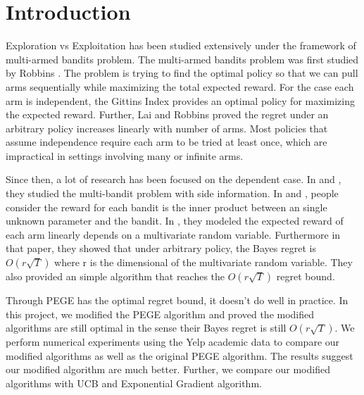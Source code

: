 \documentclass{article}
\theoremstyle{plain}
\theoremstyle{definition}
\begin{document}
 


\section{Introduction}

Exploration vs Exploitation has been studied extensively under the framework of multi-armed bandits problem. The multi-armed bandits problem was first studied by Robbins \cite{Robbins}. The problem is trying to find the optimal policy so that we can pull arms sequentially while maximizing the total expected reward. For the case each arm is independent, the Gittins Index \cite{Gittins} provides an optimal policy for maximizing the expected reward. Further, Lai and Robbins \cite{Lai} proved the regret under an arbitrary policy increases linearly with number of arms. Most policies that assume independence require each arm to be tried at least once, which are impractical in settings involving many or infinite arms. 

Since then, a lot of research has been focused on the dependent case. In \cite{Gabor} and \cite{Chih-Chun}, they studied the multi-bandit problem with side information. In \cite{Yasin1} and \cite{Yasin2}, people consider the reward for each bandit is the inner product between an single unknown parameter and the bandit. In \cite{Paat}, they modeled the expected reward of each arm linearly depends on a multivariate random variable. Furthermore in that paper, they showed that under arbitrary policy, the Bayes regret is $O(r\sqrt{T})$ where r is the dimensional of the multivariate random variable. They also provided an simple algorithm that reaches the $O(r\sqrt{T})$ regret bound.

Through PEGE has the optimal regret bound, it doesn't do well in practice. In this project, we modified the PEGE algorithm and proved the modified algorithms are still optimal in the sense their Bayes regret is still $O(r\sqrt{T})$. We perform numerical experiments using the Yelp academic data to compare our modified algorithms as well as the original PEGE algorithm. The results suggest our modified algorithm are much better. Further, we compare our modified algorithms with UCB and Exponential Gradient algorithm. 
\end{document}
